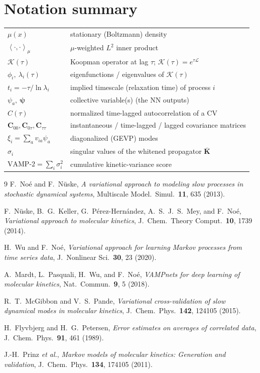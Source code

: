\documentclass[11pt]{article}
\theoremstyle{plain}
\theoremstyle{definition}
\newcommand{\Kop}{\mathcal{K}}
\newcommand{\Lop}{\mathcal{L}}
\newcommand{\inner}[2]{\left\langle #1 , #2 \right\rangle_{\mu}}
\newcommand{\Cmat}{\mathbf{C}}
\begin{document}
\section*{Notation summary}
\begin{center}
\renewcommand{\arraystretch}{1.25}
\begin{tabular}{ll}
\hline
$\mu(x)$ & stationary (Boltzmann) density\\
$\inner{\cdot}{\cdot}$ & $\mu$-weighted $L^2$ inner product\\
$\Kop(\tau)$ & Koopman operator at lag $\tau$; $\Kop(\tau)=e^{\tau\Lop}$\\
$\phi_i,\ \lambda_i(\tau)$ & eigenfunctions / eigenvalues of $\Kop(\tau)$\\
$t_i=-\tau/\ln\lambda_i$ & implied timescale (relaxation time) of process $i$\\
$\psi_a,\ \bm\psi$ & collective variable(s) (the NN outputs)\\
$C(\tau)$ & normalized time-lagged autocorrelation of a CV\\
$\Cmat_{00},\Cmat_{0\tau},\Cmat_{\tau\tau}$ & instantaneous / time-lagged / lagged covariance matrices\\
$\xi_i=\sum_a v_{ia}\psi_a$ & diagonalized (GEVP) modes\\
$\sigma_i$ & singular values of the whitened propagator $\bar{\mathbf K}$\\
$\mathrm{VAMP\text{-}2}=\sum_i\sigma_i^2$ & cumulative kinetic-variance score\\
\hline
\end{tabular}
\end{center}

\begin{thebibliography}{9}
F.~No\'e and F.~N\"uske,
\emph{A variational approach to modeling slow processes in stochastic dynamical
systems}, Multiscale Model.\ Simul.\ \textbf{11}, 635 (2013).

F.~N\"uske, B.~G.~Keller, G.~P\'erez-Hern\'andez, A.~S.~J.~S.~Mey, and F.~No\'e,
\emph{Variational approach to molecular kinetics},
J.\ Chem.\ Theory Comput.\ \textbf{10}, 1739 (2014).

H.~Wu and F.~No\'e,
\emph{Variational approach for learning Markov processes from time series data},
J.\ Nonlinear Sci.\ \textbf{30}, 23 (2020).

A.~Mardt, L.~Pasquali, H.~Wu, and F.~No\'e,
\emph{VAMPnets for deep learning of molecular kinetics},
Nat.\ Commun.\ \textbf{9}, 5 (2018).

R.~T.~McGibbon and V.~S.~Pande,
\emph{Variational cross-validation of slow dynamical modes in molecular kinetics},
J.\ Chem.\ Phys.\ \textbf{142}, 124105 (2015).

H.~Flyvbjerg and H.~G.~Petersen,
\emph{Error estimates on averages of correlated data},
J.\ Chem.\ Phys.\ \textbf{91}, 461 (1989).

J.-H.~Prinz \emph{et al.},
\emph{Markov models of molecular kinetics: Generation and validation},
J.\ Chem.\ Phys.\ \textbf{134}, 174105 (2011).
\end{thebibliography}
\end{document}
